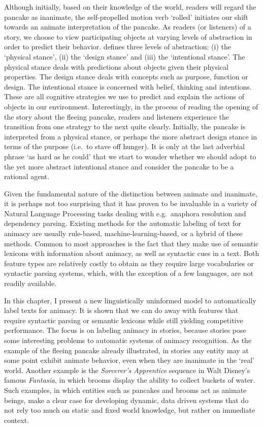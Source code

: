 Although initially, based on their knowledge of the world, readers will regard the pancake as inanimate, the self-propelled motion verb `rolled' initiates our shift towards an animate interpretation of the pancake. As readers (or listeners) of a story, we choose to view participating objects at varying levels of abstraction in order to predict their behavior. \citeauthor{dennett:1996} defines three levels of abstraction: (i) the `physical stance', (ii) the `design stance' and (iii) the `intentional stance'\autocite{dennett:1996}. The physical stance deals with predictions about objects given their physical properties. The design stance deals with concepts such as purpose, function or design. The intentional stance is concerned with belief, thinking and intentions. These are all cognitive strategies we use to predict and explain the actions of objects in our environment. Interestingly, in the process of reading the opening of the story about the fleeing pancake, readers and listeners experience the transition from one strategy to the next quite clearly. Initially, the pancake is interpreted from a physical stance, or perhaps the more abstract design stance in terms of the purpose (i.e.\ to stave off hunger). It is only at the last adverbial phrase `as hard as he could' that we start to wonder whether we should adopt to the yet more abstract intentional stance and consider the pancake to be a rational agent.

Given the fundamental nature of the distinction between animate and inanimate, it is perhaps not too surprising that it has proven to be invaluable in a variety of Natural Language Processing tasks dealing with e.g.\ anaphora resolution and dependency parsing\autocite{orasan:2007,lee:2013,ovr:niv:2007}. Existing methods for the automatic labeling of text for animacy are usually rule-based, machine-learning-based, or a hybrid of these methods. Common to most approaches is the fact that they make use of semantic lexicons with information about animacy, as well as syntactic cues in a text. Both feature types are relatively costly to obtain as they require large vocabularies or syntactic parsing systems, which, with the exception of a few languages, are not readily available.

In this chapter, I present a new linguistically uninformed model to automatically label texts for animacy. It is shown that we can do away with features that require syntactic parsing or semantic lexicons while still yielding competitive performance. The focus is on labeling animacy in stories, because stories pose some interesting problems to automatic systems of animacy recognition. As the example of the fleeing pancake already illustrated, in stories any entity may at some point exhibit animate behavior, even when they are inanimate in the `real' world. Another example is the \textit{Sorcerer's Apprentice} sequence in Walt Disney's famous \textit{Fantasia}, in which brooms display the ability to collect buckets of water. Such examples, in which entities such as pancakes and brooms act as animate beings, make a clear case for developing dynamic, data driven systems that do not rely too much on static and fixed world knowledge, but rather on immediate context.

